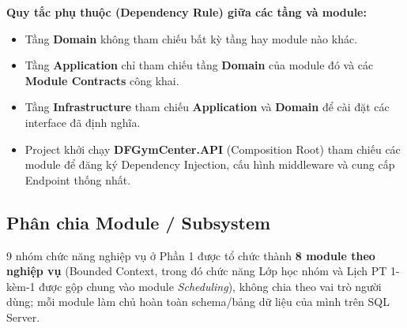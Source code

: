 \documentclass[a4paper,12pt]{article}
\begin{document}
\textbf{Quy tắc phụ thuộc (Dependency Rule) giữa các tầng và module:}
\begin{itemize}
    \item Tầng \textbf{Domain} không tham chiếu bất kỳ tầng hay module nào khác.
    \item Tầng \textbf{Application} chỉ tham chiếu tầng \textbf{Domain} của module đó và các \textbf{Module Contracts} công khai.
    \item Tầng \textbf{Infrastructure} tham chiếu \textbf{Application} và \textbf{Domain} để cài đặt các interface đã định nghĩa.
    \item Project khởi chạy \textbf{DFGymCenter.API} (Composition Root) tham chiếu các module để đăng ký Dependency Injection, cấu hình middleware và cung cấp Endpoint thống nhất.
\end{itemize}

\subsection{Phân chia Module / Subsystem}
9 nhóm chức năng nghiệp vụ ở Phần 1 được tổ chức thành \textbf{8 module theo nghiệp vụ} (Bounded Context, trong đó chức năng Lớp học nhóm và Lịch PT 1-kèm-1 được gộp chung vào module \textit{Scheduling}), không chia theo vai trò người dùng; mỗi module làm chủ hoàn toàn schema/bảng dữ liệu của mình trên SQL Server.
\end{document}

